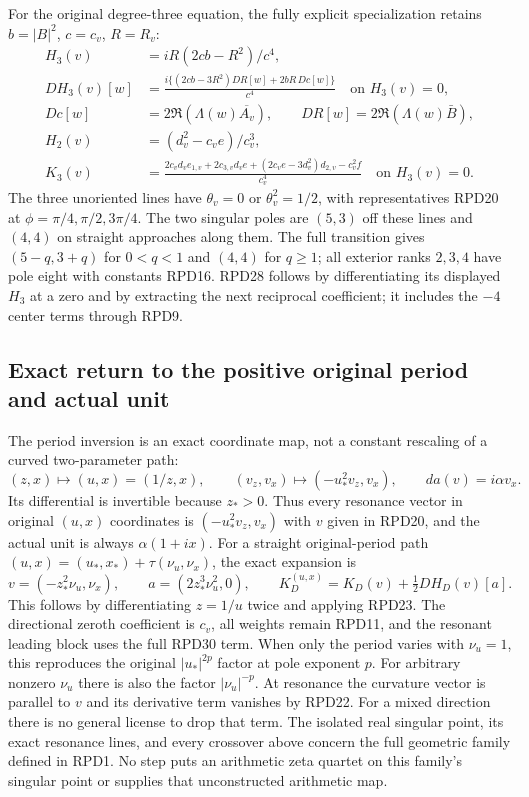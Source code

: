 \documentclass[11pt]{article}
\begin{document}
For the original degree-three equation, the fully explicit
specialization retains $b=|B|^2$, $c=c_v$, $R=R_v$:
\[
 \begin{aligned}
 H_3(v)&=iR(2cb-R^2)/c^4,\\
 DH_3(v)[w]&=\frac{i\{(2cb-3R^2)DR[w]+2bR\,Dc[w]\}}{c^4}
                    \quad\text{on }H_3(v)=0,\\
 Dc[w]&=2\Re(\Lambda(w)\overline{A_v}),\qquad
 DR[w]=2\Re(\Lambda(w)\bar B),\\
 H_2(v)&=(d_v^2-c_ve)/c_v^3,\\
 K_3(v)&=\frac{2c_vd_ve_{1,v}+2c_{3,v}d_ve
               +(2c_ve-3d_v^2)d_{2,v}-c_v^2f}{c_v^4}
                         \quad\text{on }H_3(v)=0.
 \end{aligned}\tag{RPD28}
\]
The three unoriented lines have $\theta_v=0$ or
$\theta_v^2=1/2$, with representatives RPD20 at
$\phi=\pi/4,\pi/2,3\pi/4$.  The two singular poles are $(5,3)$
off these lines and $(4,4)$ on straight approaches along them.
The full transition gives $(5-q,3+q)$ for $0<q<1$ and $(4,4)$
for $q\ge1$; all exterior ranks $2,3,4$ have pole eight with
constants RPD16.  RPD28 follows by differentiating its displayed
$H_3$ at a zero and by extracting the next reciprocal coefficient;
it includes the $-4$ center terms through RPD9.

\subsection{Exact return to the positive original period and actual unit}

The period inversion is an exact coordinate map, not a constant
rescaling of a curved two-parameter path:
\[
 (z,x)\longmapsto(u,x)=(1/z,x),\qquad
 (v_z,v_x)\longmapsto(-u_*^2v_z,v_x),\qquad
 da(v)=i\alpha v_x.\tag{RPD29}
\]
Its differential is invertible because $z_*>0$.
Thus every resonance vector in original $(u,x)$ coordinates is
$(-u_*^2v_z,v_x)$ with $v$ given in RPD20, and the actual unit
is always $\alpha(1+ix)$.
For a straight original-period path
$(u,x)=(u_*,x_*)+\tau(\nu_u,\nu_x)$, the exact expansion is
\[
 v=(-z_*^2\nu_u,\nu_x),\qquad
 a=(2z_*^3\nu_u^2,0),\qquad
 K_D^{(u,x)}=K_D(v)+\tfrac12DH_D(v)[a].\tag{RPD30}
\]
This follows by differentiating $z=1/u$ twice and applying RPD23.
The directional zeroth coefficient is $c_v$, all weights remain
RPD11, and the resonant leading block uses the full RPD30 term.
When only the period varies with $\nu_u=1$, this reproduces the original
$|u_*|^{2p}$ factor at pole exponent $p$.  For arbitrary nonzero
$\nu_u$ there is also the factor $|\nu_u|^{-p}$.
At resonance the curvature
vector is parallel to $v$ and its derivative term vanishes by
RPD22.  For a mixed direction there is no general license to drop
that term.  The isolated real singular point, its exact resonance
lines, and every crossover above concern the full geometric family
defined in RPD1.  No step puts an arithmetic zeta quartet on this
family's singular point or supplies that unconstructed arithmetic map.
\end{document}
